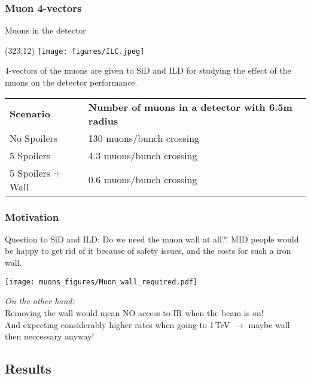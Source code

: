 \documentclass[xcolor={dvipsnames}]{beamer}
\newcommand{\ilclogo}{
  \setlength{\TPHorizModule}{1pt}
  \setlength{\TPVertModule}{1pt}
  \begin{textblock}{1}(323,12)
   \texttt{[image: figures/ILC.jpeg]}
  \end{textblock}
}
\begin{document}
\subsubsection{Muon 4-vectors}
\begin{frame}{Muons in the detector}
\ilclogo
4-vectors of the muons are given to SiD and ILD for studying the effect of the muons on the detector performance.\\
\vspace*{0.2cm}
\begin{tabular}{ll}
\textbf{Scenario} & \textbf{Number of muons in a detector with 6.5m radius}\\
 No Spoilers & 130 muons/bunch crossing\\
 5 Spoilers& 4.3 muons/bunch crossing\\
 5 Spoilers + Wall & 0.6 muons/bunch crossing
\end{tabular}
\end{frame}

\subsubsection{Motivation}
\begin{frame}{}
Question to SiD and ILD: Do we need the muon wall at all?!
MID people would be happy to get rid of it because of safety issues, and the costs for such a iron wall.
\begin{center}
\texttt{[image: muons\_figures/Muon\_wall\_required.pdf]}
\end{center}
\textit{On the other hand:}\\
\alert{Removing the wall would mean NO access to IR when the beam is on!\\
And expecting considerably higher rates when going to 1\,TeV $\rightarrow$ maybe wall then neccessary anyway!}
\end{frame}

\subsection{Results}
\end{document}
